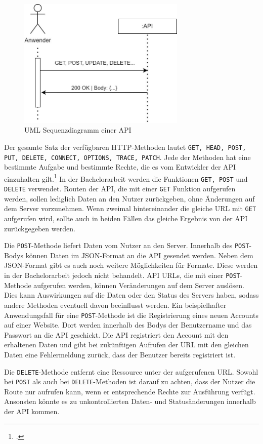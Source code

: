 \begin{figure}[H]
  \centering
    \includegraphics[width = 8cm]{bilder/APISequenzdiagramm}
    \caption{UML Sequenzdiagramm einer API}
\end{figure}

Der gesamte Satz der verfügbaren HTTP-Methoden lautet \texttt{GET, HEAD, POST, PUT, DELETE, CONNECT, OPTIONS, TRACE, PATCH}. Jede der Methoden hat eine bestimmte Aufgabe und bestimmte Rechte, die es vom Entwickler der API einzuhalten gilt.\footcite{mdn2022http} In der Bachelorarbeit werden die Funktionen \texttt{GET, POST} und \texttt{DELETE} verwendet. Routen der API, die mit einer \texttt{GET} Funktion aufgerufen werden, sollen lediglich Daten an den Nutzer zurückgeben, ohne Änderungen auf dem Server vorzunehmen. Wenn zweimal hintereinander die gleiche URL mit \texttt{GET} aufgerufen wird, sollte auch in beiden Fällen das gleiche Ergebnis von der API zurückgegeben werden.

Die \texttt{POST}-Methode liefert Daten vom Nutzer an den Server. Innerhalb des \texttt{POST}-Bodys können Daten im JSON-Format an die API gesendet werden. Neben dem JSON-Format gibt es auch noch weitere Möglichkeiten für Formate. Diese werden in der Bachelorarbeit jedoch nicht behandelt. API URLs, die mit einer \texttt{POST}-Methode aufgerufen werden, können Veränderungen auf dem Server auslösen. Dies kann Auswirkungen auf die Daten oder den Status des Servers haben, sodass andere Methoden eventuell davon beeinflusst werden. Ein beispielhafter Anwendungsfall für eine \texttt{POST}-Methode ist die Registrierung eines neuen Accounts auf einer Website. Dort werden innerhalb des Bodys der Benutzername und das Passwort an die API geschickt. Die API registriert den Account mit den erhaltenen Daten und gibt bei zukünftigen Aufrufen der URL mit den gleichen Daten eine Fehlermeldung zurück, dass der Benutzer bereits registriert ist.

Die \texttt{DELETE}-Methode entfernt eine Ressource unter der aufgerufenen URL. Sowohl bei \texttt{POST} als auch bei \texttt{DELETE}-Methoden ist darauf zu achten, dass der Nutzer die Route nur aufrufen kann, wenn er entsprechende Rechte zur Ausführung verfügt. Ansonsten könnte es zu unkontrollierten Daten- und Statusänderungen innerhalb der API kommen. 

